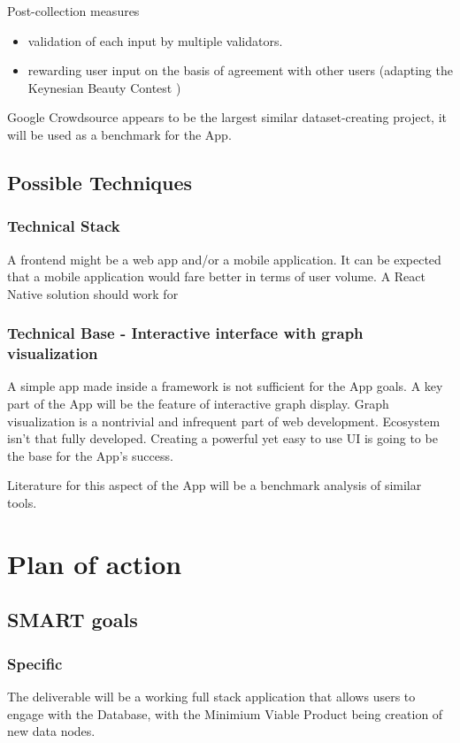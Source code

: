 \documentclass{article}
\begin{document}
Post-collection measures
\begin{itemize}
  \item validation of each input by multiple validators.  
  \item rewarding user input on the basis of agreement with other users (adapting the Keynesian Beauty Contest \cite{https://en.wikipedia.org/wiki/Keynesian_beauty_contest})
\end{itemize}

Google Crowdsource \cite{https://crowdsource.google.com/about/how-it-works/} appears to be the largest similar dataset-creating project, it will be used as a benchmark for the App.

\subsection*{Possible Techniques}
\subsubsection*{Technical Stack}
A frontend might be a web app and/or a mobile application. It can be expected that a mobile application would fare better in terms of user volume.
A React Native solution should work for \cite[]{https://necolas.github.io/react-native-web/docs/activity-indicator/} 

\subsubsection*{Technical Base  - Interactive interface with graph visualization}
A simple app made inside a framework is not sufficient for the App goals. A key part of the App will be the feature of interactive graph display.
Graph visualization is a nontrivial and infrequent part of web development. Ecosystem isn't that fully developed. Creating a powerful yet easy to use UI is going to be the base for the App's success.

Literature for this aspect of the App will be a benchmark analysis of similar tools.

\section{Plan of action}
\subsection*{SMART goals}

\subsubsection*{Specific}
The deliverable will be a working full stack application that allows users to engage with the Database, with the Minimium Viable Product being creation of new data nodes.
\end{document}
